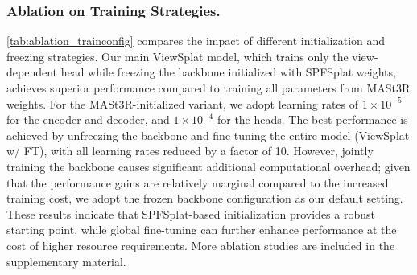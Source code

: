 \documentclass[runningheads]{llncs}
\begin{document}
\vspace{-0.5cm}
\subsubsection{Ablation on Training Strategies.}
\cref{tab:ablation_trainconfig} compares the impact of different initialization and freezing strategies. Our main ViewSplat model, which trains only the view-dependent head while freezing the backbone initialized with SPFSplat weights, achieves superior performance compared to training all parameters from MASt3R weights. For the MASt3R-initialized variant, we adopt learning rates of $1 \times 10^{-5}$ for the encoder and decoder, and $1 \times 10^{-4}$ for the heads. The best performance is achieved by unfreezing the backbone and fine-tuning the entire model (ViewSplat w/ FT), with all learning rates reduced by a factor of 10. However, jointly training the backbone causes significant additional computational overhead; given that the performance gains are relatively marginal compared to the increased training cost, we adopt the frozen backbone configuration as our default setting. These results indicate that SPFSplat-based initialization provides a robust starting point, while global fine-tuning can further enhance performance at the cost of higher resource requirements. More ablation studies are included in the supplementary material.


\end{document}
